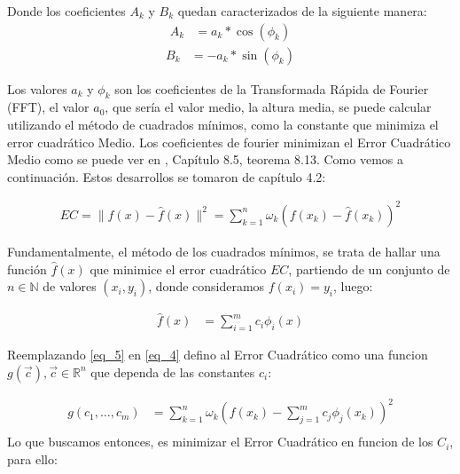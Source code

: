 \documentclass[10pt,a4paper]{article}
\numberwithin{equation}{section}
\numberwithin{figure}{section}
\numberwithin{table}{section}
\begin{document}
Donde los coeficientes $A_k$ y $B_k$ quedan caracterizados de la siguiente manera:
\begin{equation}\label{eqn:eq_3_1}
    \begin{split}
        A_k &= a_k*\cos(\phi_k)
    \end{split}
\end{equation}
\begin{equation}\label{eqn:eq_3_2}
    \begin{split}
        B_k &= -a_k*\sin(\phi_k)
    \end{split}
\end{equation}

Los valores $a_k$ y $\phi_k$ son los coeficientes de la Transformada Rápida de Fourier (FFT), el valor $a_0$, que sería el valor medio, la altura media, se puede calcular
utilizando el método de cuadrados mínimos, como la constante que minimiza el error cuadrático Medio. Los coeficientes de fourier minimizan el Error Cuadrático Medio como se puede ver en \cite{ana2}, Capítulo 8.5, teorema 8.13.
Como vemos a continuación. Estos desarrollos  se tomaron de \cite{ana1} capítulo 4.2:

\begin{equation}\label{eq_4}
    \begin{split}
        EC = \parallel f(x) - \hat{f}(x) \parallel^2 = \sum_{k=1}^{n} \omega_k (f(x_k)-\hat{f}(x_k))^2
    \end{split}
\end{equation}

Fundamentalmente, el método de los cuadrados mínimos, se trata de hallar una función $\hat{f}(x)$ que minimice el error cuadrático $EC$, partiendo de un conjunto
 de $n \in \mathbb{N}$ de valores $(x_i,y_i)$, donde consideramos $f(x_i) = y_i$, luego:

\begin{equation}\label{eq_5}
    \begin{split}
        \hat{f}(x) &= \sum_{i=1}^{m} c_i \phi_i(x)  
    \end{split}
\end{equation}

Reemplazando \ref*{eq_5} en \ref*{eq_4} defino al Error Cuadrático como una funcion $g(\vec{c}), \vec{c} \in \mathbb{R}^n $ que dependa de las constantes $c_i$:

\begin{equation}\label{eq_6}
    \begin{split}
        g(c_1,\ldots,c_m) &= \sum_{k=1}^n \omega_k ( f(x_k) - \sum_{j=1}^m  c_j \phi_j(x_k))^2\\
    \end{split}
\end{equation}
Lo que buscamos entonces, es minimizar el Error Cuadrático en funcion de los $C_i$, para ello:
\end{document}
